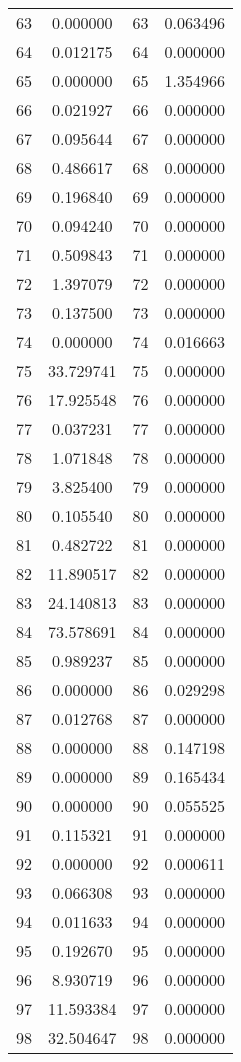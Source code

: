 \documentclass[12pt]{article}
\begin{document}
\begin{longtable}{@{}cccc@{}}
63 & 0.000000 & 63 & 0.063496 \\
64 & 0.012175 & 64 & 0.000000 \\
65 & 0.000000 & 65 & 1.354966 \\
66 & 0.021927 & 66 & 0.000000 \\
67 & 0.095644 & 67 & 0.000000 \\
68 & 0.486617 & 68 & 0.000000 \\
69 & 0.196840 & 69 & 0.000000 \\
70 & 0.094240 & 70 & 0.000000 \\
71 & 0.509843 & 71 & 0.000000 \\
72 & 1.397079 & 72 & 0.000000 \\
73 & 0.137500 & 73 & 0.000000 \\
74 & 0.000000 & 74 & 0.016663 \\
75 & 33.729741 & 75 & 0.000000 \\
76 & 17.925548 & 76 & 0.000000 \\
77 & 0.037231 & 77 & 0.000000 \\
78 & 1.071848 & 78 & 0.000000 \\
79 & 3.825400 & 79 & 0.000000 \\
80 & 0.105540 & 80 & 0.000000 \\
81 & 0.482722 & 81 & 0.000000 \\
82 & 11.890517 & 82 & 0.000000 \\
83 & 24.140813 & 83 & 0.000000 \\
84 & 73.578691 & 84 & 0.000000 \\
85 & 0.989237 & 85 & 0.000000 \\
86 & 0.000000 & 86 & 0.029298 \\
87 & 0.012768 & 87 & 0.000000 \\
88 & 0.000000 & 88 & 0.147198 \\
89 & 0.000000 & 89 & 0.165434 \\
90 & 0.000000 & 90 & 0.055525 \\
91 & 0.115321 & 91 & 0.000000 \\
92 & 0.000000 & 92 & 0.000611 \\
93 & 0.066308 & 93 & 0.000000 \\
94 & 0.011633 & 94 & 0.000000 \\
95 & 0.192670 & 95 & 0.000000 \\
96 & 8.930719 & 96 & 0.000000 \\
97 & 11.593384 & 97 & 0.000000 \\
98 & 32.504647 & 98 & 0.000000 \\

\end{longtable}
\end{document}
